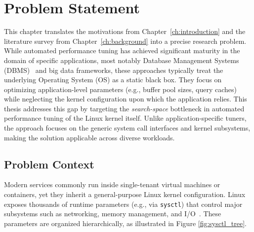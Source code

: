 \chapter{Problem Statement}\label{ch:problem}

This chapter translates the motivations from Chapter~\ref{ch:introduction} and the literature survey from Chapter~\ref{ch:background} into a precise research problem.
While automated performance tuning has achieved significant maturity in the domain of specific applications, most notably Database Management Systems (DBMS)~\cite{qtune,ottertune} and big data frameworks, these approaches typically treat the underlying Operating System (OS) as a static black box. They focus on optimizing application-level parameters (e.g., buffer pool sizes, query caches) while neglecting the kernel configuration upon which the application relies.
This thesis addresses this gap by targeting the \emph{search-space} bottleneck in automated performance tuning of the Linux kernel itself. Unlike application-specific tuners, the approach focuses on the generic system call interfaces and kernel subsystems, making the solution applicable across diverse workloads.

\section{Problem Context}\label{sec:problem-context}

Modern services commonly run inside single-tenant virtual machines or containers, yet they inherit a general-purpose Linux kernel configuration.
Linux exposes thousands of runtime parameters (e.g., via \texttt{sysctl}) that control major subsystems such as networking, memory management, and I/O~\cite{kernel_parameters}.
These parameters are organized hierarchically, as illustrated in Figure \ref{fig:sysctl_tree}.

